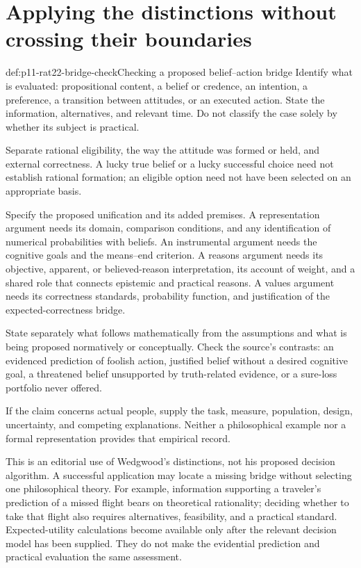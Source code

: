 \section{Applying the distinctions without crossing their boundaries}
\label{sec:p11-rat22-use}

\begin{hbmethod}{def:p11-rat22-bridge-check}{Checking a proposed belief--action bridge}
Identify what is evaluated: propositional content, a belief or credence,
an intention, a preference, a transition between attitudes, or an executed
action. State the information, alternatives, and relevant time. Do not
classify the case solely by whether its subject is practical.

Separate rational eligibility, the way the attitude was formed or held,
and external correctness. A lucky true belief or a lucky successful choice
need not establish rational formation; an eligible option need not have
been selected on an appropriate basis.

Specify the proposed unification and its added premises. A representation
argument needs its domain, comparison conditions, and any identification
of numerical probabilities with beliefs. An instrumental argument needs
the cognitive goals and the means--end criterion. A reasons argument
needs its objective, apparent, or believed-reason interpretation, its
account of weight, and a shared role that connects epistemic and practical
reasons. A values argument needs its correctness standards, probability
function, and justification of the expected-correctness bridge.

State separately what follows mathematically from the assumptions and
what is being proposed normatively or conceptually. Check the source's
contrasts: an evidenced prediction of foolish action, justified belief
without a desired cognitive goal, a threatened belief unsupported by
truth-related evidence, or a sure-loss portfolio never offered.

If the claim concerns actual people, supply the task, measure, population,
design, uncertainty, and competing explanations. Neither a philosophical
example nor a formal representation provides that empirical record.
\end{hbmethod}

This is an editorial use of Wedgwood's distinctions, not his proposed
decision algorithm. A successful application may locate a missing bridge
without selecting one philosophical theory. For example, information
supporting a traveler's prediction of a missed flight bears on theoretical
rationality; deciding whether to take that flight also requires alternatives,
feasibility, and a practical standard. Expected-utility calculations become
available only after the relevant decision model has been supplied. They
do not make the evidential prediction and practical evaluation the same
assessment.

